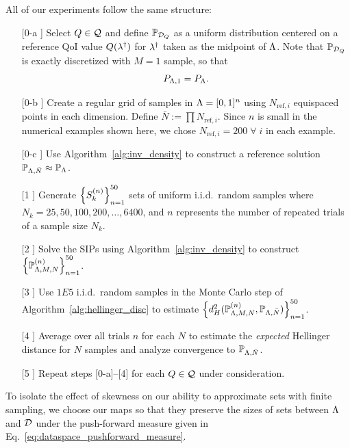 All of our experiments follow the same structure:
\begin{itemize}
\item[[0-a]] Select $Q\in\mathcal{Q}$ and define $\mathbb{P}_{\mathcal{D}_Q}$ as a uniform distribution centered on a reference QoI value $Q(\lambda^\dagger)$ for $\lambda^\dagger$ taken as the midpoint of ${\Lambda}$. 
Note that $\mathbb{P}_{\mathcal{D}_Q}$ is exactly discretized with $M=1$ sample, so that 
\[
P_{{\Lambda}, 1} = P_{\Lambda}.
\]
\item[[0-b]] Create a regular grid of samples in ${\Lambda}=[0,1]^n$ using $N_{\text{ref},i}$ equispaced points in each dimension. 
Define $\bar{N} := \prod N_{\text{ref},i}$.
Since $n$ is small in the numerical examples shown here, we chose $N_{\text{ref},i} = 200 \; \forall \; i$ in each example.
\item[[0-c]] Use Algorithm~\ref{alg:inv_density} to construct a reference solution $\mathbb{P}_{{\Lambda},\bar{N}}\approx \mathbb{P}_{\Lambda}$.
\item[[1]] Generate $\left\{S_k^{(n)}\right\}_{n=1}^{50}$ sets of uniform i.i.d.~random samples where $N_k = 25, 50, 100, 200, \hdots, 6400$, and $n$ represents the number of repeated trials of a sample size $N_k$.
\item[[2]] Solve the SIPs using Algorithm~\ref{alg:inv_density} to construct $\left\{\mathbb{P}_{{\Lambda},M,N}^{(n)}\right\}_{n=1}^{50}$.
\item[[3]] Use $1E5$ i.i.d.~random samples in the Monte Carlo step of Algorithm~\ref{alg:hellinger_disc} to estimate $\left\{d_H^2( \mathbb{P}_{{\Lambda},M,N}^{(n)}, \mathbb{P}_{{\Lambda},\bar{N}})\right\}_{n=1}^{50}$.
\item[[4]] Average over all trials $n$ for each $N$ to estimate the {\em expected} Hellinger distance for $N$ samples and analyze convergence to $\mathbb{P}_{{\Lambda},\bar{N}}$. 
\item[[5]] Repeat steps [0-a]--[4] for each $Q\in\mathcal{Q}$ under consideration. 
\end{itemize}
To isolate the effect of skewness on our ability to approximate sets with finite sampling, we choose our maps so that they preserve the sizes of sets between ${\Lambda}$ and $\mathcal{D}$ under the push-forward measure given in Eq.~\eqref{eq:dataspace_pushforward_measure}. 

